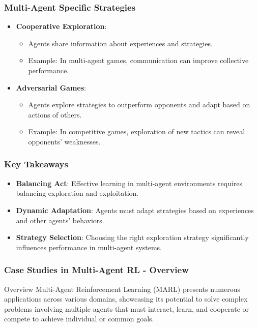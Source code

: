 \documentclass[aspectratio=169]{beamer}
\begin{document}
\begin{frame}[fragile]
    \frametitle{Multi-Agent Specific Strategies}
    \begin{itemize}
        \item \textbf{Cooperative Exploration}:
            \begin{itemize}
                \item Agents share information about experiences and strategies.
                \item Example: In multi-agent games, communication can improve collective performance.
            \end{itemize}
        \item \textbf{Adversarial Games}:
            \begin{itemize}
                \item Agents explore strategies to outperform opponents and adapt based on actions of others.
                \item Example: In competitive games, exploration of new tactics can reveal opponents' weaknesses.
            \end{itemize}
    \end{itemize}
\end{frame}

\begin{frame}[fragile]
    \frametitle{Key Takeaways}
    \begin{itemize}
        \item \textbf{Balancing Act}: Effective learning in multi-agent environments requires balancing exploration and exploitation.
        \item \textbf{Dynamic Adaptation}: Agents must adapt strategies based on experiences and other agents' behaviors.
        \item \textbf{Strategy Selection}: Choosing the right exploration strategy significantly influences performance in multi-agent systems.
    \end{itemize}
\end{frame}

\begin{frame}[fragile]
    \frametitle{Case Studies in Multi-Agent RL - Overview}
    \begin{block}{Overview}
        Multi-Agent Reinforcement Learning (MARL) presents numerous applications across various domains, 
        showcasing its potential to solve complex problems involving multiple agents that must interact, learn,
        and cooperate or compete to achieve individual or common goals.
    \end{block}
\end{frame}
\end{document}
